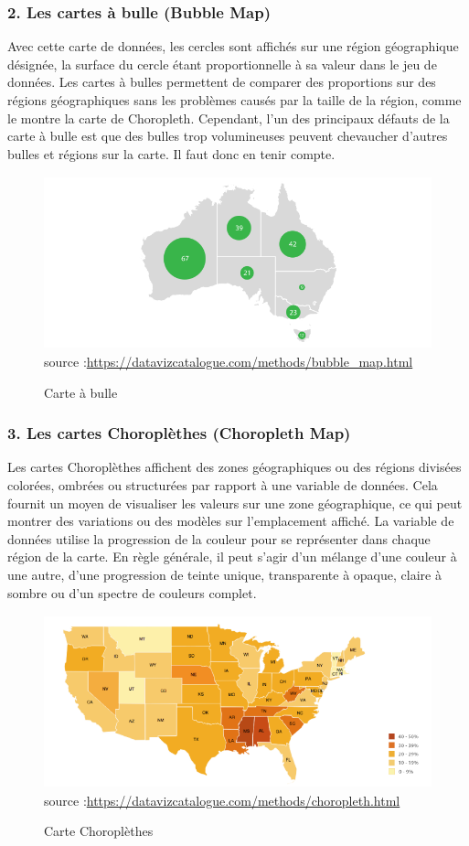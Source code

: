 \documentclass[french, a4paper, 12pt]{report}
\begin{document}
\subsubsection{2. Les cartes à bulle (Bubble Map)}
Avec cette carte de données, les cercles sont affichés sur une région géographique désignée, la surface du cercle étant proportionnelle à sa valeur dans le jeu de données. Les cartes à bulles permettent de comparer des proportions sur des régions géographiques sans les problèmes causés par la taille de la région, comme le montre la carte de Choropleth. Cependant, l'un des principaux défauts de la carte à bulle est que des bulles trop volumineuses peuvent chevaucher d'autres bulles et régions sur la carte. Il faut donc en tenir compte.
\begin{figure}[!ht]
    \centering
    \includegraphics[height=5cm]{images/bubble_map.png}
    \scriptsize{source :\url{https://datavizcatalogue.com/methods/bubble_map.html}}
    \caption{Carte à bulle}
    \label{fig:2.8}
\end{figure}
\subsubsection{3. Les cartes Choroplèthes (Choropleth Map)}
Les cartes Choroplèthes affichent des zones géographiques ou des régions divisées colorées, ombrées ou structurées par rapport à une variable de données. Cela fournit un moyen de visualiser les valeurs sur une zone géographique, ce qui peut montrer des variations ou des modèles sur l'emplacement affiché.
La variable de données utilise la progression de la couleur pour se représenter dans chaque région de la carte. En règle générale, il peut s'agir d'un mélange d'une couleur à une autre, d'une progression de teinte unique, transparente à opaque, claire à sombre ou d'un spectre de couleurs complet.
\begin{figure}[!ht]
    \centering
    \includegraphics[height=5cm]{images/choropleth.png}
    \scriptsize{source :\url{https://datavizcatalogue.com/methods/choropleth.html}}
    \caption{Carte Choroplèthes}
    \label{fig:2.9}
\end{figure}
\end{document}
